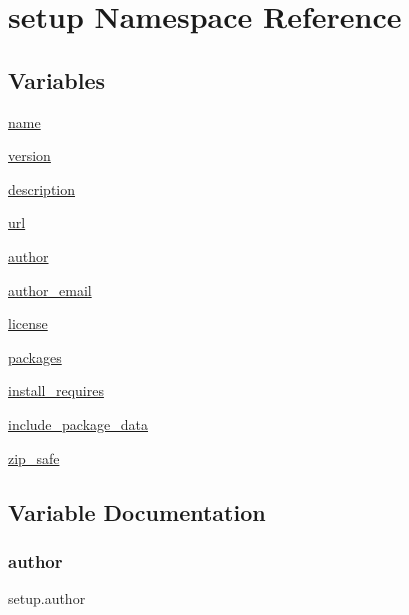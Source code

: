 \hypertarget{namespacesetup}{}\section{setup Namespace Reference}
\label{namespacesetup}
\subsection*{Variables}
\begin{DoxyCompactItemize}
\item 
\hyperlink{namespacesetup_ab3a7a0638d76a01367c5bc3cc699447f}{name}
\item 
\hyperlink{namespacesetup_a2aa722b36a933088812b50ea79b97a5c}{version}
\item 
\hyperlink{namespacesetup_aedf461ec52a946bda975938ba0b93ec0}{description}
\item 
\hyperlink{namespacesetup_afc13124aa5c0124e84e1d965e3f4b0fb}{url}
\item 
\hyperlink{namespacesetup_a3a57a4772d418a06835249cbade0d86a}{author}
\item 
\hyperlink{namespacesetup_a5b08034343aa2be607722a8b315f3625}{author\+\_\+email}
\item 
\hyperlink{namespacesetup_a8ed6f50a28bd6a8794f8e1153baa6de9}{license}
\item 
\hyperlink{namespacesetup_aff2375a361fd5865c77bd9aa093be747}{packages}
\item 
\hyperlink{namespacesetup_abead4f26b530856f858f0d44c7cf2588}{install\+\_\+requires}
\item 
\hyperlink{namespacesetup_a35139105b25ef46629d31888bad595d8}{include\+\_\+package\+\_\+data}
\item 
\hyperlink{namespacesetup_a13510753661cb74083a0c664db11dde9}{zip\+\_\+safe}
\end{DoxyCompactItemize}


\subsection{Variable Documentation}
\mbox{\label{namespacesetup_a3a57a4772d418a06835249cbade0d86a}} 
\subsubsection{\texorpdfstring{author}{author}}
{\footnotesize\ttfamily setup.\+author}


